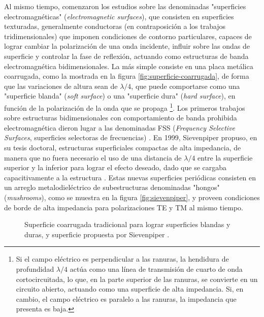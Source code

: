 Al mismo tiempo, comenzaron los estudios sobre las denominadas "superficies electromagnéticas" (\textit{electromagnetic surfaces}), que consisten en superficies texturadas, generalmente conductoras (en contraposición a los trabajos tridimensionales) que imponen condiciones de contorno particulares, capaces de lograr cambiar la polarización de una onda incidente, influir sobre las ondas de superficie y controlar la fase de reflexión, actuando como estructuras de banda electromagnética bidimensionales. La más simple consiste en una placa metálica coarrugada, como la mostrada en la figura \ref{fig:superficie-coarrugada}, de forma que las variaciones de altura sean de $\lambda/4$, que puede comportarse como una "superficie blanda" (\textit{soft surface}) o una "superficie dura" (\textit{hard surface}), en función de la polarización de la onda que se propaga \footnote{Si el campo eléctrico es perpendicular a las ranuras, la hendidura de profundidad $\lambda/4$ actúa como una línea de transmisión de cuarto de onda cortocircuitada, lo que, en la parte superior de las ranuras, se convierte en un circuito abierto, actuando como una superficie de alta impedancia. Si, en cambio, el campo eléctrico es paralelo a las ranuras, la impedancia que presenta es baja.}. Los primeros trabajos sobre estructuras bidimensionales con comportamiento de banda prohibida electromagnética dieron lugar a las denominadas FSS (\textit{Frequency Selective Surfaces}, superficies selectoras de frecuencias) \cite{Munk}. En 1999, Sievenpiper \cite{Sievenpiper:Thesis} propuso, en su tesis doctoral, estructuras superficiales compactas de alta impedancia, de manera que no fuera necesario el uso de una distancia de $\lambda/4$ entre la superficie superior y la inferior para lograr el efecto deseado, dado que se cargaba capacitivamente a la estructura \cite{Marcela:Tesis} \cite{Sievenpiper:HIESForbiddenBand}. Estas nuevas superficies periódicas consisten en un arreglo metalodieléctrico de subestructuras denominadas "hongos" (\textit{mushrooms}), como se muestra en la figura \ref{fig:sievenpiper}, y proveen condiciones de borde de alta impedancia para polarizaciones TE y TM al mismo tiempo.

\begin{figure}[H]
	\centering 
	\hspace{30pt}
	\caption{Superficie coarrugada tradicional para lograr superficies blandas y duras, y superficie propuesta por Sievenpiper \cite{Sievenpiper:Thesis}.}
	\label{fig:sievenpiper-comparacion}
\end{figure}

